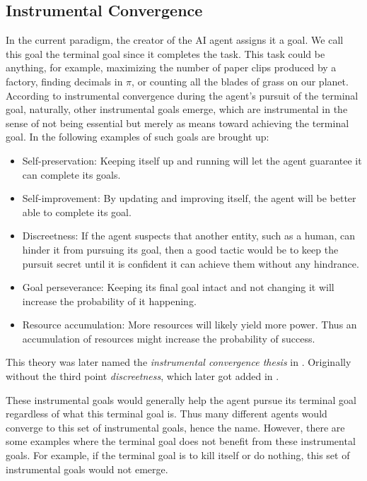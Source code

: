 \documentclass[12pt,A4]{report}
\theoremstyle{definition}
\begin{document}
\subsection{Instrumental Convergence}
In the current paradigm, the creator of the AI agent assigns it a goal. We call this goal the terminal goal since it completes the task. This task could be anything, for example, maximizing the number of paper clips produced by a factory, finding decimals in $\pi$, or counting all the blades of grass on our planet. According to instrumental convergence during the agent's pursuit of the terminal goal, naturally, other instrumental goals emerge, which are instrumental in the sense of not being essential but merely as means toward achieving the terminal goal. In \citet{Omohundro08} the following examples of such goals are brought up: 
\begin{itemize}
    \item Self-preservation: Keeping itself up and running will let the agent guarantee it can complete its goals.
    \item Self-improvement: By updating and improving itself, the agent will be better able to complete its goal.
    \item Discreetness: If the agent suspects that another entity, such as a human, can hinder it from pursuing its goal, then a good tactic would be to keep the pursuit secret until it is confident it can achieve them without any hindrance. 
    \item Goal perseverance: Keeping its final goal intact and not changing it will increase the probability of it happening. 
    \item Resource accumulation: More resources will likely yield more power. Thus an accumulation of resources might increase the probability of success.
\end{itemize}
This theory was later named the \textit{instrumental convergence thesis} in \citet{Bostrom12}. Originally without the third point \textit{discreetness}, which later got added in \citet{Bostrom14}.

These instrumental goals would generally help the agent pursue its terminal goal regardless of what this terminal goal is. Thus many different agents would converge to this set of instrumental goals, hence the name. However, there are some examples where the terminal goal does not benefit from these instrumental goals. For example, if the terminal goal is to kill itself or do nothing, this set of instrumental goals would not emerge. 
\end{document}

